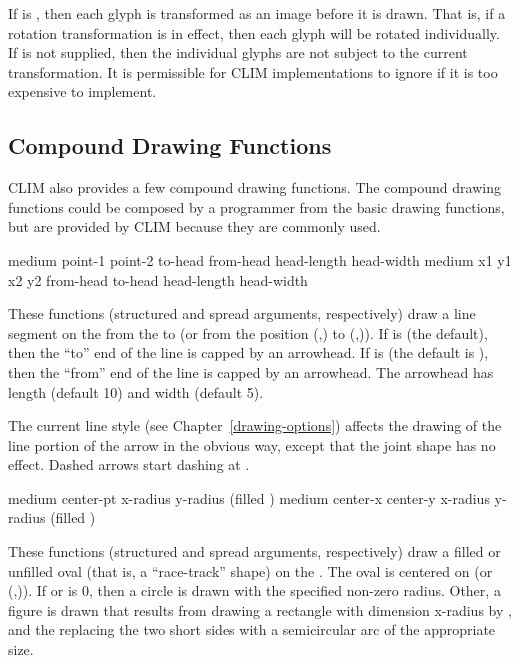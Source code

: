If  is , then each glyph is transformed as an
image before it is drawn.  That is, if a rotation transformation is in effect,
then each glyph will be rotated individually.  If  is not
supplied, then the individual glyphs are not subject to the current
transformation.  It is permissible for CLIM implementations to ignore
 if it is too expensive to implement.


\subsection {Compound Drawing Functions}

CLIM also provides a few compound drawing functions.  The compound drawing
functions could be composed by a programmer from the basic drawing functions,
but are provided by CLIM because they are commonly used.

  {medium point-1 point-2 \key \DrawingOptions \LineCapOptions
                      to-head from-head head-length head-width}
 {medium x1 y1 x2 y2 \key \DrawingOptions \LineCapOptions
                      from-head to-head head-length head-width}

These functions (structured and spread arguments, respectively) draw a line
segment on the   from the   to
 (or from the position (,) to (,)).
If  is  (the default), then the ``to'' end of the line
is capped by an arrowhead.  If  is  (the default is
), then the ``from'' end of the line is capped by an arrowhead.  The
arrowhead has length  (default 10) and width 
(default 5).

The current line style (see Chapter~\ref{drawing-options}) affects the drawing
of the line portion of the arrow in the obvious way, except that the joint shape
has no effect.  Dashed arrows start dashing at .


  {medium center-pt x-radius y-radius \key (filled )
                     \DrawingOptions \LineCapOptions}
 {medium center-x center-y x-radius y-radius \key (filled )
                     \DrawingOptions \LineCapOptions}

These functions (structured and spread arguments, respectively) draw a filled or
unfilled oval (that is, a ``race-track'' shape) on the  .
The oval is centered on  (or (,)).
If  or  is $0$, then a circle is drawn with the
specified non-zero radius.  Other, a figure is drawn that results from drawing a
rectangle with dimension {x-radius} by , and the replacing the two
short sides with a semicircular arc of the appropriate size.


